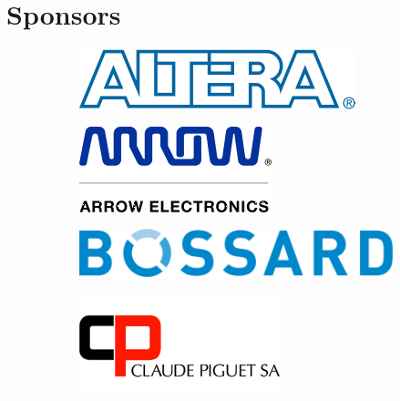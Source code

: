 
\section{Sponsors}
\begin{figure}[h!]
    \centering
    \begin{subfigure}[h]{0.15\textheight}
        \includegraphics[width=\textwidth]{images/sponsors/altera}
    \end{subfigure}%
    \hspace{1cm}
    \begin{subfigure}[h]{0.15\textheight}
        \includegraphics[width=\textwidth]{images/sponsors/arrow}
    \end{subfigure}
    \vspace{0.4cm}


\vspace{0.4cm}


    \begin{subfigure}[h]{0.15\textheight}
        \includegraphics[width=\textwidth]{images/sponsors/bossard}
    \end{subfigure}%
    \hspace{1cm}
    \begin{subfigure}[h]{0.15\textheight}
        \includegraphics[width=\textwidth]{images/sponsors/claudePiguet}
    \end{subfigure}
\vspace{0.4cm}



\end{figure}
